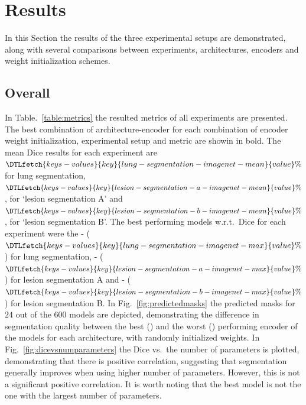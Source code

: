 \documentclass{elsarticle}
\begin{document}
\section{Results}\label{sec:results}
In this Section the results of the three experimental setups are
demonstrated, along with several comparisons between experiments,
architectures, encoders and weight initialization schemes.

\subsection{Overall}
In Table.~\ref{table:metrics} the resulted metrics of all experiments
are presented.
The best combination of architecture-encoder for each combination of
encoder weight initialization, experimental setup and metric are showin in bold.
The mean Dice results for each experiment are
$\DTLfetch{keys-values}{key}{lung-segmentation-imagenet-mean}{value}\%$
for lung segmentation,
$\DTLfetch{keys-values}{key}{lesion-segmentation-a-imagenet-mean}{value}\%$,
for `lesion segmentation A' and
$\DTLfetch{keys-values}{key}{lesion-segmentation-b-imagenet-mean}{value}\%$,
for `lesion segmentation B'.
The best performing models w.r.t.\ Dice for each experiment were the
-
($\DTLfetch{keys-values}{key}{lung-segmentation-imagenet-max}{value}\%$)
for lung segmentation,
-
($\DTLfetch{keys-values}{key}{lesion-segmentation-a-imagenet-max}{value}\%$)
for lesion segmentation A and
-
($\DTLfetch{keys-values}{key}{lesion-segmentation-b-imagenet-max}{value}\%$)
for lesion segmentation B.
In Fig.~\ref{fig:predictedmasks} the predicted masks for $24$ out of
the $600$ models are depicted, demonstrating the difference in
segmentation quality between the best
() and the worst
() performing
encoder of the models for each architecture, with randomly initialized weights.
In Fig.~\ref{fig:dicevsnumparameters} the Dice vs.\ the number of
parameters is plotted, demonstrating that there is positive
correlation, suggesting that segmentation generally improves when
using higher number of parameters.
However, this is not a significant positive correlation.
It is worth noting that the best model is not the one with the
largest number of parameters.
\end{document}

